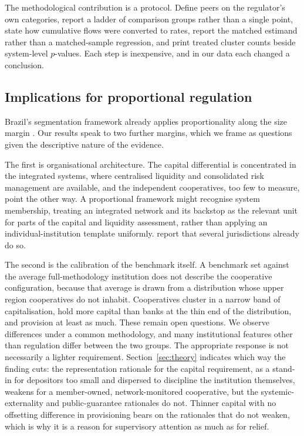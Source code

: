 \documentclass[11pt,a4paper]{article}
\begin{document}
The methodological contribution is a protocol. Define peers on the regulator's own
categories, report a ladder of comparison groups rather than a single point, state how
cumulative flows were converted to rates, report the matched estimand rather than a
matched-sample regression, and print treated cluster counts beside system-level
$p$-values. Each step is inexpensive, and in our data each changed a conclusion.

\subsection{Implications for proportional regulation}

Brazil's segmentation framework already applies proportionality along the size margin
\citep{cmn4553}. Our results speak to two further margins, which we frame as questions
given the descriptive nature of the evidence.

The first is organisational architecture. The capital differential is concentrated in the
integrated systems, where centralised liquidity and consolidated risk management are
available, and the independent cooperatives, too few to measure, point the other way. A
proportional framework might recognise system membership, treating an integrated network
and its backstop as the relevant unit for parts of the capital and liquidity assessment,
rather than applying an individual-institution template uniformly. \citet{coelho2019}
report that several jurisdictions already do so.

The second is the calibration of the benchmark itself. A benchmark set against the
average full-methodology institution does not describe the cooperative configuration,
because that average is drawn from a distribution whose upper region cooperatives do not
inhabit. Cooperatives cluster in a narrow band of capitalisation, hold more capital than
banks at the thin end of the distribution, and provision at least as much. These remain
open questions. We observe differences under a common methodology, and many institutional
features other than regulation differ between the two groups. The appropriate response is
not necessarily a lighter requirement. Section~\ref{sec:theory} indicates which way the
finding cuts: the representation rationale for the capital requirement, as a stand-in for
depositors too small and dispersed to discipline the institution themselves, weakens for
a member-owned, network-monitored cooperative, but the systemic-externality and
public-guarantee rationales do not. Thinner capital with no offsetting difference in
provisioning bears on the rationales that do not weaken, which is why it is a reason for
supervisory attention as much as for relief.
\end{document}
